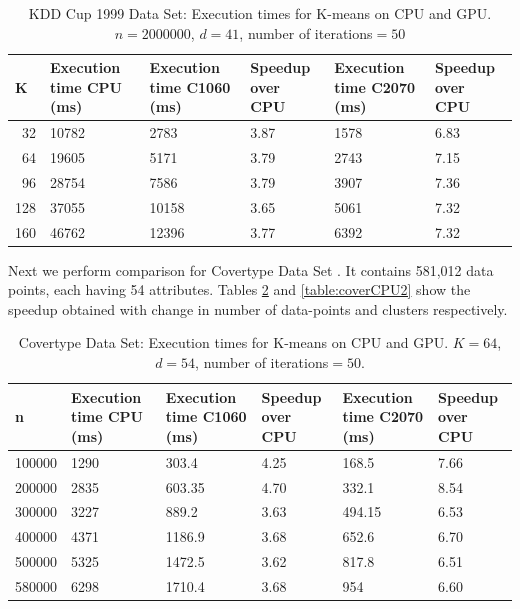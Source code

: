 \begin{table}[htbp]
\begin{center}
\begin{tabular}{|r|p{2.8cm}|p{2.8cm}|p{2cm}|p{2.8cm}|p{2cm}|}
\hline
\multicolumn{1}{|l|}{K} & \multicolumn{1}{p{2.8cm}|}{Execution time CPU (ms)} & \multicolumn{1}{p{2.8cm}|}{Execution time C1060 (ms)} & \multicolumn{1}{p{2cm}|}{Speedup over CPU} & Execution time C2070 (ms) & \multicolumn{1}{p{2cm}|}{Speedup over CPU} \\ \hline
32 & 10782 & 2783 & 3.87 & 1578 & 6.83 \\ \hline
64 & 19605 & 5171 & 3.79 & 2743 & 7.15 \\ \hline
96 & 28754 & 7586 & 3.79 & 3907 & 7.36 \\ \hline
128 & 37055 & 10158 & 3.65 & 5061 & 7.32 \\ \hline
160 & 46762 & 12396 & 3.77 & 6392 & 7.32 \\ \hline
\end{tabular}
\end{center}
\caption{KDD Cup 1999 Data Set: Execution times for K-means on CPU and GPU. $n = 2000000$, $d = 41$, number of iterations$ = 50$}
\label{table:kddCPU2}
\end{table}

Next we perform comparison for Covertype Data Set \cite{coverType}. It contains  581,012 data points, each having 54 attributes. Tables \ref{table:coverCPU} and \ref{table:coverCPU2} show the speedup obtained with change in number of data-points and clusters respectively.

\begin{table}[htbp]
\begin{center}
\begin{tabular}{|r|p{2.8cm}|p{2.8cm}|p{2cm}|p{2.8cm}|p{2cm}|}
\hline
\multicolumn{1}{|l|}{n} & \multicolumn{1}{p{2.8cm}|}{Execution time CPU (ms)} & \multicolumn{1}{p{2.8cm}|}{Execution time C1060 (ms)} & \multicolumn{1}{p{2cm}|}{Speedup over CPU} & Execution time C2070 (ms) & \multicolumn{1}{p{2cm}|}{Speedup over CPU} \\ \hline
100000 & 1290 & 303.4 & 4.25 & 168.5 & 7.66 \\ \hline
200000 & 2835 & 603.35 & 4.70 & 332.1 & 8.54 \\ \hline
300000 & 3227 & 889.2 & 3.63 & 494.15 & 6.53 \\ \hline
400000 & 4371 & 1186.9 & 3.68 & 652.6 & 6.70 \\ \hline
500000 & 5325 & 1472.5 & 3.62 & 817.8 & 6.51 \\ \hline
580000 & 6298 & 1710.4 & 3.68 & 954 & 6.60 \\ \hline
\end{tabular}
\end{center}
\caption{Covertype Data Set: Execution times for K-means on CPU and GPU. $K = 64$, $d = 54$, number of iterations$ = 50$.}
\label{table:coverCPU}
\end{table}


